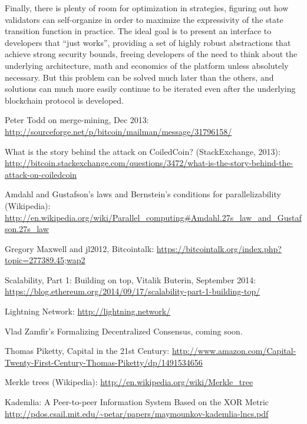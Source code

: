 \documentclass[11pt,a4paper]{report}
\theoremstyle{plain}
\theoremstyle{definition}
\theoremstyle{remark}
\begin{document}
Finally, there is plenty of room for optimization in strategies, figuring out how validators can self-organize in order to maximize the expressivity of the state transition function in practice. The ideal goal is to present an interface to developers that ``just works'', providing a set of highly robust abstractions that achieve strong security bounds, freeing developers of the need to think about the underlying architecture, math and economics of the platform unless absolutely necessary. But this problem can be solved much later than the others, and solutions can much more easily continue to be iterated even after the underlying blockchain protocol is developed.

\begin{thebibliography}{27}

    Peter Todd on merge-mining, Dec 2013: \url{http://sourceforge.net/p/bitcoin/mailman/message/31796158/}

    What is the story behind the attack on CoiledCoin? (StackExchange, 2013): \url{http://bitcoin.stackexchange.com/questions/3472/what-is-the-story-behind-the-attack-on-coiledcoin}

    Amdahl and Gustafson's laws and Bernstein's conditions for parallelizability (Wikipedia): \url{http://en.wikipedia.org/wiki/Parallel_computing#Amdahl.27s_law_and_Gustafson.27s_law}

    Gregory Maxwell and jl2012, Bitcointalk: \url{https://bitcointalk.org/index.php?topic=277389.45;wap2}

    Scalability, Part 1: Building on top, Vitalik Buterin, September 2014: \url{https://blog.ethereum.org/2014/09/17/scalability-part-1-building-top/}

    Lightning Network: \url{http://lightning.network/}

    Vlad Zamfir's Formalizing Decentralized Consensus, coming soon.

    Thomas Piketty, Capital in the 21st Century: \url{http://www.amazon.com/Capital-Twenty-First-Century-Thomas-Piketty/dp/1491534656}

    Merkle trees (Wikipedia): \url{http://en.wikipedia.org/wiki/Merkle_tree}

    Kademlia: A Peer-to-peer Information System Based on the XOR Metric \url{http://pdos.csail.mit.edu/~petar/papers/maymounkov-kademlia-lncs.pdf}


\end{thebibliography}
\end{document}
